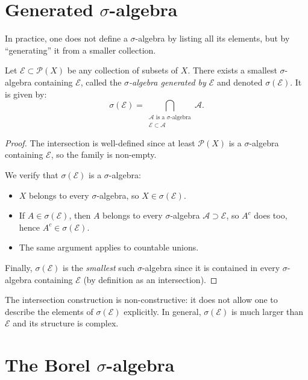 \section{Generated $\sigma$-algebra}

In practice, one does not define a $\sigma$-algebra by listing all its elements, but
by ``generating'' it from a smaller collection.

\begin{theorem}
\label{thm:generated_sigma}
Let $\mathcal{E} \subset \mathcal{P}(X)$ be any collection of subsets of $X$. There
exists a smallest $\sigma$-algebra containing $\mathcal{E}$, called the
\emph{$\sigma$-algebra generated by $\mathcal{E}$} and denoted $\sigma(\mathcal{E})$.
It is given by:
\[
\sigma(\mathcal{E}) = \bigcap_{\substack{\mathcal{A} \text{ is a $\sigma$-algebra} \\
\mathcal{E} \subset \mathcal{A}}} \mathcal{A}.
\]
\end{theorem}

\begin{proof}
The intersection is well-defined since at least $\mathcal{P}(X)$ is a
$\sigma$-algebra containing $\mathcal{E}$, so the family is non-empty.

We verify that $\sigma(\mathcal{E})$ is a $\sigma$-algebra:
\begin{itemize}
    \item $X$ belongs to every $\sigma$-algebra, so $X \in \sigma(\mathcal{E})$.
    \item If $A \in \sigma(\mathcal{E})$, then $A$ belongs to every $\sigma$-algebra
    $\mathcal{A} \supset \mathcal{E}$, so $A^c$ does too, hence
    $A^c \in \sigma(\mathcal{E})$.
    \item The same argument applies to countable unions.
\end{itemize}
Finally, $\sigma(\mathcal{E})$ is the \emph{smallest} such $\sigma$-algebra since
it is contained in every $\sigma$-algebra containing $\mathcal{E}$ (by definition
as an intersection).
\end{proof}

\begin{remark}
The intersection construction is non-constructive: it does not allow one to describe
the elements of $\sigma(\mathcal{E})$ explicitly. In general,
$\sigma(\mathcal{E})$ is much larger than $\mathcal{E}$ and its structure is complex.
\end{remark}

\section{The Borel $\sigma$-algebra}

